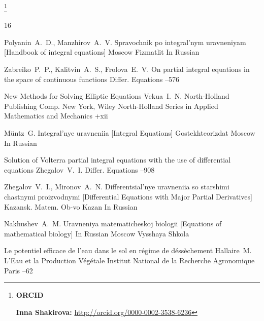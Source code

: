 \RuDate	


\vspace{1cm}

\makeentitle



\thanks{{\bf ORCID}

{\bf Inna Shakirova:} \url{http://orcid.org/0000-0002-3538-6236}
}

\EngRef


\begin{thebibliography}{16}

\by Polyanin~A.~D., Manzhirov~A.~V.
\book Spravochnik po integral’nym uravneniyam \rm [Handbook of integral equations]
\publaddr Moscow
\publ Fizmatlit
\lang In Russian

\by Zabreiko~P.~P., Kalitvin~A.~S., Frolova~E.~V.
\paper On partial integral equations in the space of continuous functions
\jour Differ. Equations
--576 


\book New Methods for Solving Elliptic Equations
\by Vekua~I.~N.
\publ North-Holland Publishing Comp.
\publaddr New York,  Wiley
\serial North-Holland Series in Applied Mathematics and Mechanics
+xii


\by M\"untz~G.
\book Integral'nye uravneniia \rm [Integral Equations]
\publ Gostekhteorizdat
\publaddr Moscow
\lang In Russian

\paper Solution of Volterra partial integral equations with the use of differential equations
\by Zhegalov~V.~I.
\jour Differ. Equations
--908

\by Zhegalov~V.~I., Mironov~A.~N.
\book Differentsial'nye uravneniia so starshimi chastnymi proizvodnymi \rm [Differential Equations with Major Partial Derivatives] 
\publ Kazansk. Matem. Ob-vo
\publ Kazan
\lang In Russian

\by Nakhushev~A.~M.
\book Uravneniya matematicheskoj biologii \rm [Equations of mathematical biology]
\lang In Russian
\publaddr Moscow
\publ Vysshaya Shkola


\paper Le potentiel efficace de l'eau dans le sol en r\'egime de d\'ess\`echement   
\by Hallaire~M.
\inbook L'Eau et la Production V\'eg\'etale
\publ Institut National de la Recherche Agronomique
\publaddr Paris
--62


\end{thebibliography}
